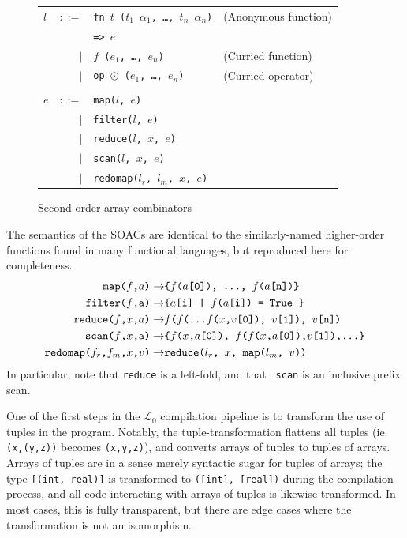 \documentclass{sigplanconf}  %
\newcommand{\LO}{$\mathcal{L}_0$}
\begin{document}
\begin{figure}[bt]
\begin{tabular}{lrll}
$l$ & $::=$ & {\tt fn $t$ ($t_{1}$ $\alpha_{1}$, \ldots, $t_{n}$ $\alpha_{n}$)} & (Anonymous function) \\
&     & {\tt => $e$} \\
& $|$ & {\tt $f$ ($e_{1}$, \ldots, $e_{n}$)} & (Curried function) \\
& $|$ & {\tt op $\odot$ ($e_{1}$, \ldots, $e_{n}$)} & (Curried operator) \\
\\
$e$ & $::=$ & {\tt map($l$, $e$)} \\
    & $|$ & {\tt filter($l$, $e$)} \\
    & $|$ & {\tt reduce($l$, $x$, $e$)} \\
    & $|$ & {\tt scan($l$, $x$, $e$)} \\
    & $|$ & {\tt redomap($l_{r}$, $l_{m}$, $x$, $e$)} \\
\end{tabular}
\caption{Second-order array combinators}
\label{fig:soacs}
\end{figure}

The semantics of the SOACs are identical to the similarly-named
higher-order functions found in many functional languages, but
reproduced here for completeness.
\begin{align*}
\text{\tt map($f$,$a$)} \rightarrow& \text{\tt\{$f$($a$[0]), \ldots, $f$($a$[n])\}} \\
\text{\tt filter($f$,a)} \rightarrow&  \text{\tt\{$a$[i] | $f$($a$[i]) = {\tt True }\}} \\
\text{\tt reduce($f$,$x$,$a$)} \rightarrow& \text{\tt $f$($f$(\ldots $f$($x$,$v$[0]), $v$[1]), $v$[n])} \\
\text{\tt scan($f$,$x$,a)} \rightarrow& \text{\tt\{$f$($x$,$a$[0]), $f$($f$($x$,$a$[0]),$v$[1]),\ldots\}} \\
\text{\tt redomap($f_{r}$,$f_{m}$,$x$,$v$)} \rightarrow& \text{\tt reduce($l_{r}$, $x$, map($l_{m}$, $v$))} \\
\end{align*}
In particular, note that {\tt reduce} is a left-fold, and that {\tt
  scan} is an inclusive prefix scan.

One of the first steps in the \LO{} compilation pipeline is to
transform the use of tuples in the program.  Notably, the
tuple-transformation flattens all tuples (ie. {\tt (x,(y,z))} becomes
{\tt (x,y,z)}), and converts arrays of tuples to tuples of arrays.
Arrays of tuples are in a sense merely syntactic sugar for tuples of
arrays; the type {\tt [(int, real)]} is transformed to {\tt ([int],
  [real])} during the compilation process, and all code interacting
with arrays of tuples is likewise transformed.  In most cases, this is
fully transparent, but there are edge cases where the transformation
is not an isomorphism.
\end{document}
